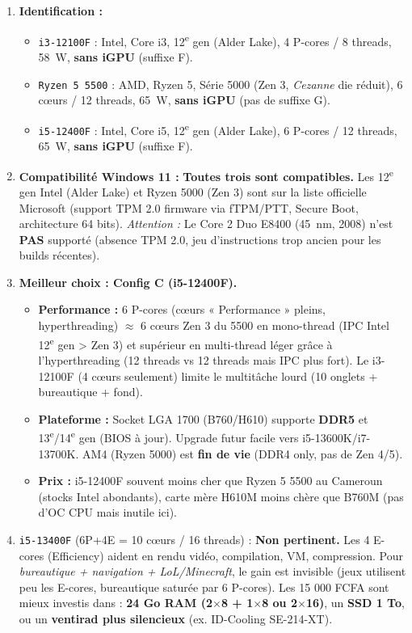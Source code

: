 \documentclass[11pt]{article}
\begin{document}
\begin{corrige}
\begin{enumerate}
    \item \textbf{Identification :}
        \begin{itemize}
            \item \texttt{i3-12100F} : Intel, Core i3, 12\textsuperscript{e} gen (Alder Lake), 4 P-cores / 8 threads, \SI{58}{\watt}, \textbf{sans iGPU} (suffixe F).
            \item \texttt{Ryzen 5 5500} : AMD, Ryzen 5, Série 5000 (Zen 3, \emph{Cezanne} die réduit), 6 cœurs / 12 threads, \SI{65}{\watt}, \textbf{sans iGPU} (pas de suffixe G).
            \item \texttt{i5-12400F} : Intel, Core i5, 12\textsuperscript{e} gen (Alder Lake), 6 P-cores / 12 threads, \SI{65}{\watt}, \textbf{sans iGPU} (suffixe F).
        \end{itemize}
    \item \textbf{Compatibilité Windows 11 :} \textbf{Toutes trois sont compatibles.} Les 12\textsuperscript{e} gen Intel (Alder Lake) et Ryzen 5000 (Zen 3) sont sur la liste officielle Microsoft (support TPM 2.0 firmware via fTPM/PTT, Secure Boot, architecture 64 bits). \emph{Attention :} Le Core 2 Duo E8400 (\SI{45}{\nano\meter}, 2008) n'est \textbf{PAS} supporté (absence TPM 2.0, jeu d'instructions trop ancien pour les builds récentes).
    \item \textbf{Meilleur choix : Config C (i5-12400F).}
        \begin{itemize}
            \item \textbf{Performance :} 6 P-cores (cœurs « Performance » pleins, hyperthreading) $\approx$ 6 cœurs Zen 3 du 5500 en mono-thread (IPC Intel 12\textsuperscript{e} gen > Zen 3) et supérieur en multi-thread léger grâce à l'hyperthreading (12 threads vs 12 threads mais IPC plus fort). Le i3-12100F (4 cœurs seulement) limite le multitâche lourd (10 onglets + bureautique + fond).
            \item \textbf{Plateforme :} Socket LGA 1700 (B760/H610) supporte \textbf{DDR5} et 13\textsuperscript{e}/14\textsuperscript{e} gen (BIOS à jour). Upgrade futur facile vers i5-13600K/i7-13700K. AM4 (Ryzen 5000) est \textbf{fin de vie} (DDR4 only, pas de Zen 4/5).
            \item \textbf{Prix :} i5-12400F souvent moins cher que Ryzen 5 5500 au Cameroun (stocks Intel abondants), carte mère H610M moins chère que B760M (pas d'OC CPU mais inutile ici).
        \end{itemize}
    \item \texttt{i5-13400F} (6P+4E = 10 cœurs / 16 threads) : \textbf{Non pertinent.} Les 4 E-cores (Efficiency) aident en rendu vidéo, compilation, VM, compression. Pour \emph{bureautique + navigation + LoL/Minecraft}, le gain est invisible (jeux utilisent peu les E-cores, bureautique saturée par 6 P-cores). Les 15 000 FCFA sont mieux investis dans : \textbf{24 Go RAM (2$\times$8 + 1$\times$8 ou 2$\times$16)}, un \textbf{SSD 1 To}, ou un \textbf{ventirad plus silencieux} (ex. ID-Cooling SE-214-XT).
\end{enumerate}
\end{corrige}
\end{document}
